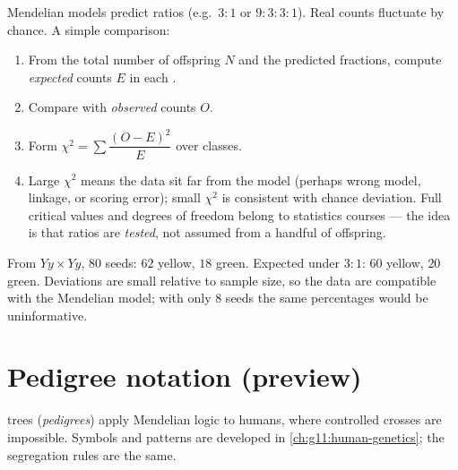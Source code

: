 \begin{method}
\label{met:g11:mendelian-genetics:chi-square}
Mendelian models predict ratios (e.g.\ $3:1$ or $9:3:3:1$). Real counts
fluctuate by chance. A simple comparison:
\begin{enumerate}
  \item From the total number of offspring $N$ and the predicted fractions,
        compute \emph{expected} counts $E$ in each .
  \item Compare with \emph{observed} counts $O$.
  \item Form $\chi^{2} = \sum \dfrac{(O-E)^{2}}{E}$ over classes.
  \item Large $\chi^{2}$ means the data sit far from the model (perhaps wrong
        model, linkage, or scoring error); small $\chi^{2}$ is consistent with
        chance deviation. Full critical values and degrees of freedom belong
        to statistics courses --- the  idea is that ratios are
        \emph{tested}, not assumed from a handful of offspring.
\end{enumerate}
\end{method}

\begin{example}[Checking a $3:1$]\label{ex:g11:mendelian-genetics:chi}
From $Yy \times Yy$, $80$ seeds: $62$ yellow, $18$ green. Expected under
$3:1$: $60$ yellow, $20$ green. Deviations are small relative to sample size,
so the data are compatible with the Mendelian model; with only $8$ seeds the
same percentages would be uninformative.
\end{example}

\section{Pedigree notation (preview)}

\begin{remark}
 trees (\emph{pedigrees}) apply Mendelian logic to humans, where controlled
crosses are impossible. Symbols and  patterns are developed in
\cref{ch:g11:human-genetics}; the segregation rules are the same.
\end{remark}

